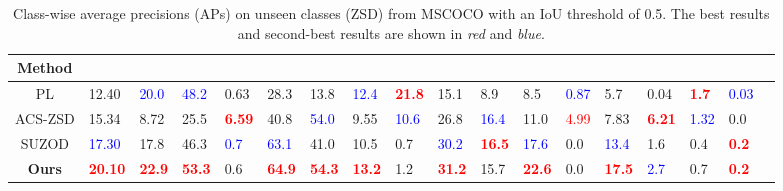 \documentclass{bmvc2k}
\begin{document}
\begin{table}[t]
	\caption{ Class-wise average precisions (APs) on unseen classes (ZSD) from MSCOCO with an IoU threshold of 0.5. The best results and second-best results are shown in \textit{red} and \textit{blue}.}
	
	\centering
	\label{tab:zsd1-class_wise_coco}
	\begin{adjustbox}{max width=\textwidth}
		\begin{tabular}{|c *{17}{|p{4ex}}|}
			\hline
{\bf Method} &
			 &
			 &
			 &
			 &
			 &
			 &
			 &
			 &
			 &
			 &
			 &
			 &
			 &
			 &
			 &
			\\ \hline
			
			
			PL\cite{rahman2018polarity} &12.40&\textcolor{blue}{20.0}&\textcolor{blue}{48.2}&0.63&28.3&13.8&\textcolor{blue}{12.4}&{\bf \textcolor{red}{21.8}}&15.1&8.9&8.5&\textcolor{blue}{0.87}&5.7&0.04&{\bf \textcolor{red}{1.7}}&\textcolor{blue}{0.03}\\ 
			
			ACS-ZSD\cite{mao2020zero} &15.34&8.72&25.5&{\bf \textcolor{red}{6.59}}&40.8&\textcolor{blue}{54.0}&9.55&\textcolor{blue}{10.6}&26.8&\textcolor{blue}{16.4}&11.0&\textcolor{red}{4.99}&7.83&{\bf \textcolor{red}{6.21}}&\textcolor{blue}{1.32}&0.0\\
			
			SUZOD\cite{hayat2020synthesizing} &\textcolor{blue}{17.30}&17.8&46.3&\textcolor{blue}{0.7}&\textcolor{blue}{63.1}&41.0&10.5&
			0.7&\textcolor{blue}{30.2}&{\bf \textcolor{red}{16.5}}&\textcolor{blue}{17.6}&0.0&\textcolor{blue}{13.4}&{1.6}&0.4&{\bf \textcolor{red}{0.2}} \\ \hline
			
			{\bf Ours}   &{\bf \textcolor{red}{20.10}}&{\bf \textcolor{red}{22.9}}&{\bf \textcolor{red}{53.3}}&0.6&{\bf \textcolor{red}{64.9}}&{\bf \textcolor{red}{54.3}}&{\bf \textcolor{red}{13.2}}&1.2&{\bf \textcolor{red}{31.2}}&15.7&{\bf \textcolor{red}{22.6}}&0.0&{\bf \textcolor{red}{17.5}}&\textcolor{blue}{2.7}&0.7&{\bf \textcolor{red}{0.2}} \\ \hline
			
		\end{tabular}
	\end{adjustbox}
	
\end{table}
\end{document}
